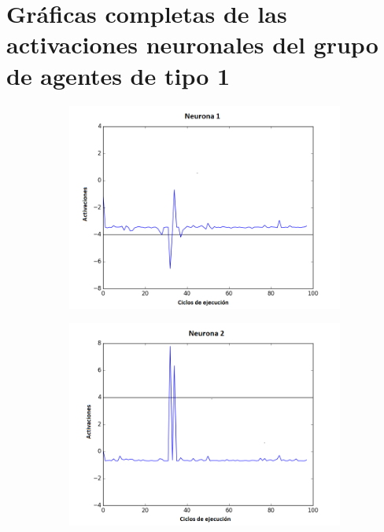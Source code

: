 \chapter{Gráficas completas de las activaciones neuronales del grupo de agentes de tipo 1}\label{ch:anexo3}
\begin{figure}[!h]
    \centering %
\begin{subfigure}{0.33\textwidth}
  \includegraphics[width=\linewidth]{Imagenes/Agente1Activaciones/Agente0/Neurona0}
\end{subfigure}\hfil %
\begin{subfigure}{0.33\textwidth}
  \includegraphics[width=\linewidth]{Imagenes/Agente1Activaciones/Agente0/Neurona1}

\end{subfigure}
\end{figure}
